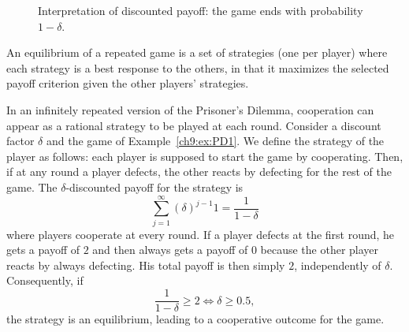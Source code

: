 \begin{figure}
    \centering
    \caption{Interpretation of discounted payoff: the game ends with
    probability $1 - \delta$.}
    \label{fig:infiRepeatedDiscount}
\end{figure}

\begin{definition}
An equilibrium of a repeated game is a set of strategies (one per player)
where each strategy is a best response to the others, in that it maximizes
the selected payoff criterion given the other players' strategies.
\end{definition}

\begin{example}
\label{ch9:ex:trigger}
In an infinitely repeated version of the Prisoner's Dilemma, cooperation
can appear as a rational strategy to be played at each round.
Consider a discount factor $\delta$ and the game of
Example~\ref{ch9:ex:PD1}.
We define the strategy of the player as follows: each player is supposed
to start the game by cooperating. Then, if at any round a player defects,
the other reacts by defecting for the rest of the game.
The $\delta$-discounted payoff for the strategy is
$$\sum_{j = 1}^{\infty}(\delta)^{j-1} 1 = \frac{1}{1-\delta}$$
where players cooperate at every round.
If a player defects at the first round, he gets a payoff of $2$ and then
always gets a payoff of $0$ because the other player reacts by always
defecting. His total payoff is then simply $2$, independently of $\delta$.
Consequently, if
$$\frac{1}{1-\delta} \geq 2 \Leftrightarrow \delta \geq 0.5,$$
the  strategy is an equilibrium, leading to a cooperative outcome for
the game.
\end{example}


